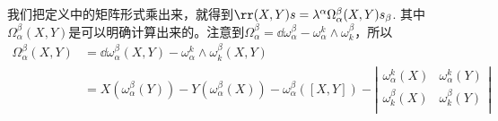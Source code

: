 我们把定义中的矩阵形式乘出来，就得到$\rr(X,Y)s=\lambda^{\alpha}\Omega^{\beta}_{\alpha}(X,Y)s_{\beta}$. 其中$\Omega^{\beta}_{\alpha}(X,Y)$是可以明确计算出来的。注意到$\Omega^{\beta}_{\alpha}=\dd \omega^{\beta}_{\alpha}-\omega_{\alpha}^{k}\wedge\omega_{k}^{\beta}$，所以
\[
\begin{split}
\Omega^{\beta}_{\alpha}(X,Y)&=\dd \omega^{\beta}_{\alpha}(X,Y)-\omega_{\alpha}^{k}\wedge\omega_{k}^{\beta}(X,Y)\\
&=X\left(\omega^{\beta}_{\alpha}(Y) \right)-Y\left(\omega^{\beta}_{\alpha}(X) \right)-\omega^{\beta}_{\alpha}\left([X,Y] \right)-\left| \begin{array}{cc}{\omega^{k}_{\alpha}(X)} & {\omega^{k}_{\alpha}(Y)}\\ {\omega^{\beta}_{k}(X)} & {\omega^{\beta}_{k}(Y)}\\ \end{array}\right|
\end{split}
\]

